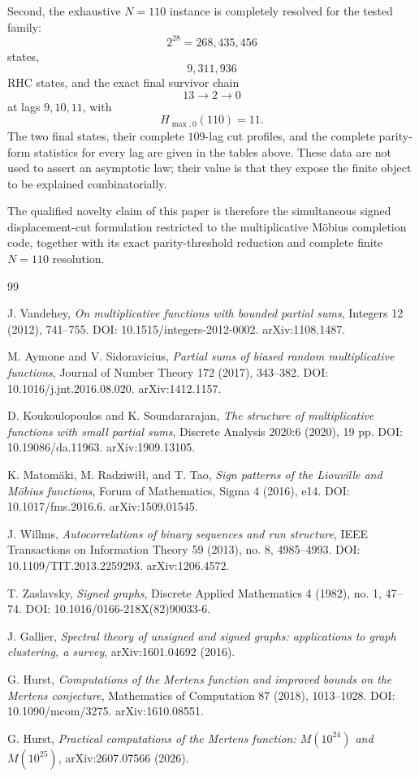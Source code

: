 \documentclass[11pt]{article}
\begin{document}
Second, the exhaustive $N=110$ instance is completely resolved for the tested family:
\[
 2^{28}=268{,}435{,}456
\]
states,
\[
 9{,}311{,}936
\]
RHC states, and the exact final survivor chain
\[
 \boxed{13\to2\to0}
\]
at lags $9,10,11$, with
\[
 \boxed{H_{\max,0}(110)=11.}
\]
The two final states, their complete $109$-lag cut profiles, and the complete parity-form statistics for every lag are given in the tables above.  These data are not used to assert an asymptotic law; their value is that they expose the finite object to be explained combinatorially.

The qualified novelty claim of this paper is therefore the simultaneous signed displacement-cut formulation restricted to the multiplicative M\"obius completion code, together with its exact parity-threshold reduction and complete finite $N=110$ resolution.

\sloppy
\begin{thebibliography}{99}

J. Vandehey,
\emph{On multiplicative functions with bounded partial sums},
Integers 12 (2012), 741--755.
DOI: 10.1515/integers-2012-0002.
arXiv:1108.1487.

M. Aymone and V. Sidoravicius,
\emph{Partial sums of biased random multiplicative functions},
Journal of Number Theory 172 (2017), 343--382.
DOI: 10.1016/j.jnt.2016.08.020.
arXiv:1412.1157.

D. Koukoulopoulos and K. Soundararajan,
\emph{The structure of multiplicative functions with small partial sums},
Discrete Analysis 2020:6 (2020), 19 pp.
DOI: 10.19086/da.11963.
arXiv:1909.13105.

K. Matom\"aki, M. Radziwi{\l}{\l}, and T. Tao,
\emph{Sign patterns of the Liouville and M\"obius functions},
Forum of Mathematics, Sigma 4 (2016), e14.
DOI: 10.1017/fms.2016.6.
arXiv:1509.01545.

J. Willms,
\emph{Autocorrelations of binary sequences and run structure},
IEEE Transactions on Information Theory 59 (2013), no. 8, 4985--4993.
DOI: 10.1109/TIT.2013.2259293.
arXiv:1206.4572.

T. Zaslavsky,
\emph{Signed graphs},
Discrete Applied Mathematics 4 (1982), no. 1, 47--74.
DOI: 10.1016/0166-218X(82)90033-6.

J. Gallier,
\emph{Spectral theory of unsigned and signed graphs: applications to graph clustering, a survey},
arXiv:1601.04692 (2016).

G. Hurst,
\emph{Computations of the Mertens function and improved bounds on the Mertens conjecture},
Mathematics of Computation 87 (2018), 1013--1028.
DOI: 10.1090/mcom/3275.
arXiv:1610.08551.

G. Hurst,
\emph{Practical computations of the Mertens function: $M(10^{24})$ and $M(10^{25})$},
arXiv:2607.07566 (2026).

\end{thebibliography}
\fussy
\end{document}
